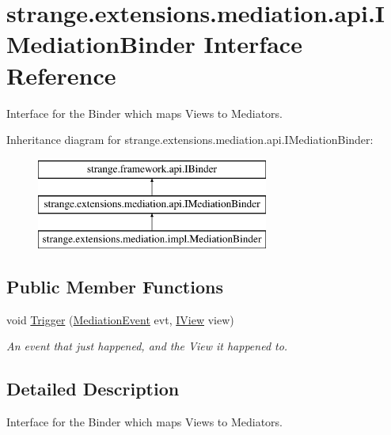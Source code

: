 \hypertarget{interfacestrange_1_1extensions_1_1mediation_1_1api_1_1_i_mediation_binder}{\section{strange.\-extensions.\-mediation.\-api.\-I\-Mediation\-Binder Interface Reference}
\label{interfacestrange_1_1extensions_1_1mediation_1_1api_1_1_i_mediation_binder}
}


Interface for the Binder which maps Views to Mediators.  


Inheritance diagram for strange.\-extensions.\-mediation.\-api.\-I\-Mediation\-Binder\-:\begin{figure}[H]
\begin{center}
\leavevmode
\includegraphics[height=3.000000cm]{interfacestrange_1_1extensions_1_1mediation_1_1api_1_1_i_mediation_binder}
\end{center}
\end{figure}
\subsection*{Public Member Functions}
\begin{DoxyCompactItemize}
\item 
void \hyperlink{interfacestrange_1_1extensions_1_1mediation_1_1api_1_1_i_mediation_binder_a7e394e1dbd3279239425740221f727c7}{Trigger} (\hyperlink{namespacestrange_1_1extensions_1_1mediation_1_1api_ae5a81bb1edf9fca1d2aca9f4fada72a8}{Mediation\-Event} evt, \hyperlink{interfacestrange_1_1extensions_1_1mediation_1_1api_1_1_i_view}{I\-View} view)
\begin{DoxyCompactList}\small\item\em An event that just happened, and the View it happened to. \end{DoxyCompactList}\end{DoxyCompactItemize}


\subsection{Detailed Description}
Interface for the Binder which maps Views to Mediators. 

